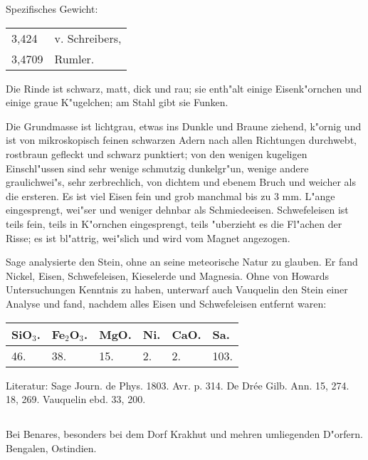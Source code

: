 \documentclass[a4paper, 11pt, oneside]{article}
\begin{document}
Spezifisches Gewicht:
\begin{table}[!ht]
    \centering\swabfamily\Large
    \begin{tabular}{l l}
        3,424 & v. Schreibers,\\
        3,4709 & Rumler.
    \end{tabular}
\end{table}

Die Rinde ist schwarz, matt, dick und rau; sie enth"alt einige Eisenk"ornchen und einige graue K"ugelchen; am Stahl gibt sie Funken.

Die Grundmasse ist lichtgrau, etwas ins Dunkle und Braune ziehend, k"ornig und ist von mikroskopisch feinen schwarzen Adern nach allen Richtungen durchwebt, rostbraun gefleckt und schwarz punktiert; von den wenigen kugeligen Einschl"ussen sind sehr wenige schmutzig dunkelgr"un, wenige andere graulichwei"s, sehr zerbrechlich, von dichtem und ebenem Bruch und weicher als die ersteren. Es ist viel Eisen fein und grob manchmal bis zu 3 mm. L"ange eingesprengt, wei"ser und weniger dehnbar als Schmiedeeisen. Schwefeleisen ist teils fein, teils in K"ornchen eingesprengt, teils "uberzieht es die Fl"achen der Risse; es ist bl"attrig, wei"slich und wird vom Magnet angezogen.

Sage analysierte den Stein, ohne an seine meteorische Natur zu glauben. Er fand Nickel, Eisen, Schwefeleisen, Kieselerde und Magnesia. Ohne von Howards Untersuchungen Kenntnis zu haben, unterwarf auch Vauquelin den Stein einer Analyse und fand, nachdem alles Eisen und Schwefeleisen entfernt waren:
\begin{table}[!ht]
    \centering\swabfamily\Large
    \begin{tabular}{l l l l l l}
        SiO$_{3}$. & Fe$_{2}$O$_{3}$. & MgO. & Ni. & CaO. & Sa. \\ \hline
        46. & 38. & 15. & 2. & 2. & 103. \\
    \end{tabular}
\end{table}

\normalsize
Literatur: Sage Journ. de Phys. 1803. Avr. p. 314. De Drée Gilb. Ann. 15, 274. 18, 269. Vauquelin ebd. 33, 200.
\subsection{}
\LARGE
\paragraph{}
Bei Benares, besonders bei dem Dorf Krakhut und mehren umliegenden D"orfern. Bengalen, Ostindien.
\end{document}
